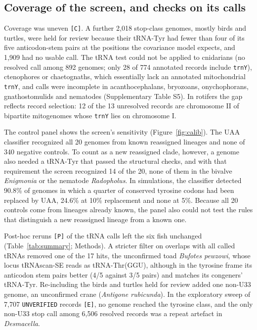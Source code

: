 \documentclass[11pt, a4paper]{article}
\begin{document}
\subsection{Coverage of the screen, and checks on its calls}\label{sec:checks}
Coverage was uneven \texttt{[C]}. A further 2,018 stop-class genomes, mostly birds and turtles, were held for review because their tRNA-Tyr had fewer than four of its five anticodon-stem pairs at the positions the covariance model expects, and 1,909 had no usable call. The tRNA test could not be applied to cnidarians (no resolved call among 892 genomes; only 28 of 774 annotated records include \texttt{trnY}), ctenophores or chaetognaths, which essentially lack an annotated mitochondrial \texttt{trnY}, and calls were incomplete in acanthocephalans, bryozoans, onychophorans, gnathostomulids and nematodes (Supplementary Table S5). In rotifers the gap reflects record selection: 12 of the 13 unresolved records are chromosome II of bipartite mitogenomes whose \texttt{trnY} lies on chromosome I.

The control panel shows the screen's sensitivity (Figure~\ref{fig:calib}). The UAA classifier recognized all 20 genomes from known reassigned lineages and none of 340 negative controls. To count as a new reassigned clade, however, a genome also needed a tRNA-Tyr that passed the structural checks, and with that requirement the screen recognized 14 of the 20, none of them in the bivalve \textit{Enigmonia} or the nematode \textit{Radopholus}. In simulations, the classifier detected 90.8\% of genomes in which a quarter of conserved tyrosine codons had been replaced by UAA, 24.6\% at 10\% replacement and none at 5\%. Because all 20 controls come from lineages already known, the panel also could not test the rules that distinguish a new reassigned lineage from a known one.

Post-hoc reruns \texttt{[P]} of the tRNA calls left the six fish unchanged (Table~\ref{tab:summary}; Methods). A stricter filter on overlaps with all called tRNAs removed one of the 17 hits, the unconfirmed toad \textit{Bufotes pewzowi}, whose locus tRNAscan-SE reads as tRNA-Thr(GGU), although in the tyrosine frame its anticodon stem pairs better (4/5 against 3/5 pairs) and matches its congeners' tRNA-Tyr. Re-including the birds and turtles held for review added one non-U33 genome, an unconfirmed crane (\textit{Antigone rubicunda}). In the exploratory sweep of 7,707 \texttt{UNVERIFIED} records \texttt{[E]}, no genome reached the tyrosine class, and the only non-U33 stop call among 6,506 resolved records was a repeat artefact in \textit{Desmacella}.
\end{document}
